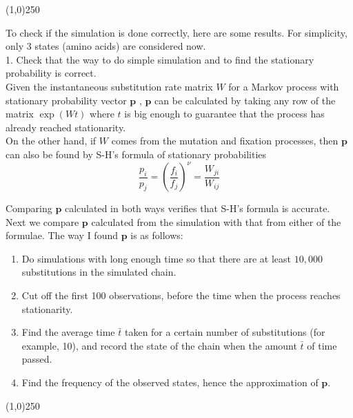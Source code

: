 \documentclass[13pt]{article}
\begin{document}
\begin{center}
\line(1,0){250}
\end{center}

To check if the simulation is done correctly, here are some results. For simplicity, only 3 states (amino acids) are considered now. \\

1. Check that the way to do simple simulation and to find the stationary probability is correct.\\

Given the instantaneous substitution rate matrix $W$ for a Markov process with stationary probability vector $\mathbf{p}$ , $\mathbf{p}$ can be calculated by taking any row of the matrix $\exp(Wt)$ where $t$ is big enough to guarantee that the process has already reached stationarity. \\

On the other hand, if $W$ comes from the mutation and fixation processes, then $\mathbf{p}$ can also be found by S-H's formula of stationary probabilities
\begin{equation}
\frac{p_i}{p_j} = (\frac{f_i}{f_j})^{\nu} = \frac{W_{ji}}{W_{ij}}
\label{eq:stationary}
\end{equation}




Comparing $\mathbf{p}$ calculated in both ways verifies that S-H's formula is accurate. Next we compare $\mathbf{p}$ calculated from the simulation with that from either of the formulae. The way I found $\mathbf{p}$ is as follows:\\
\begin{enumerate}
\item Do simulations with long enough time so that there are at least $10,000$ substitutions in the simulated chain.
\item Cut off the first 100 observations, before the time when the process reaches stationarity.
\item Find the average time $\bar{t}$ taken for a certain number of substitutions (for example, 10), and record the state of the chain when the amount $\bar{t}$ of time passed.
\item Find the frequency of the observed states, hence the approximation of $\mathbf{p}$.
\end{enumerate}

\begin{center}
\line(1,0){250}
\end{center}
\end{document}
